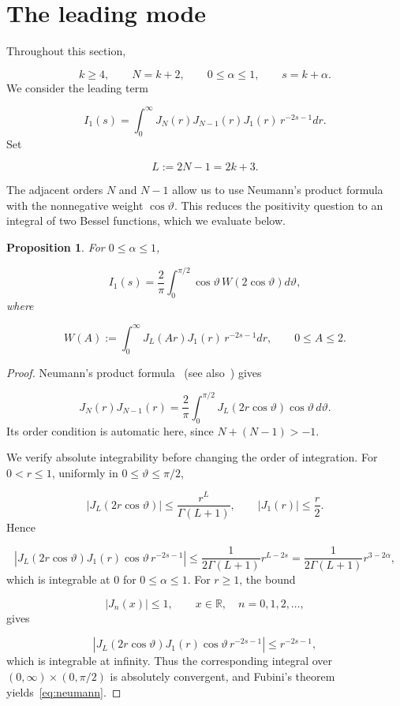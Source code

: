 \documentclass[11pt]{article}
\theoremstyle{plain}
\newtheorem{proposition}[theorem]{Proposition}
\theoremstyle{definition}
\theoremstyle{remark}
\begin{document}
\section{The leading mode}\label{sec:leading}

Throughout this section,

\[
  k \ge 4, \qquad  N = k+2, \qquad  0 \le \alpha \le 1, \qquad  s = k + \alpha .
\]
We consider the leading term

\[
  I_{1}(s) = \int_{0}^{\infty } J_N(r) J_{N-1}(r) J_{1}(r)\, r^{-2s-1} dr .
\]
Set

\[
  L := 2N - 1 = 2k+3 .
\]

The adjacent orders $N$ and $N-1$ allow us to use Neumann's product formula with the nonnegative weight $\cos \vartheta$. This reduces the positivity question to an integral of two Bessel functions, which we evaluate below.

\begin{proposition}\label{res:4.1}
For $0 \le \alpha \le 1$,

\begin{equation}\label{eq:neumann}
  I_{1}(s) = \frac{2}{\pi } \int_{0}^{\pi /2} \cos \vartheta \, W(2\cos \vartheta ) d\vartheta ,
\end{equation}
where

\[
  W(A) := \int_{0}^{\infty } J_L(Ar) J_{1}(r)\, r^{-2s-1} dr , \qquad  0 \le A \le 2 .
\]
\end{proposition}

\begin{proof}
Neumann's product formula~\cite[Eq.~10.9.26]{r1} (see also~\cite[Eq.~(5.43.1), p.~150]{r8}) gives

\[
  J_N(r) J_{N-1}(r) = \frac{2}{\pi } \int_{0}^{\pi /2} J_L(2r\cos \vartheta ) \cos \vartheta \, d\vartheta .
\]
Its order condition is automatic here, since $N + (N-1) > -1$.

We verify absolute integrability before changing the order of integration. For $0 < r \le 1$, uniformly in $0 \le \vartheta \le \pi /2$,

\[
  |J_L(2r\cos \vartheta )| \le \frac{r^{L}}{\Gamma (L+1)} , \qquad  |J_{1}(r)| \le \frac{r}{2} .
\]
Hence

\[
  \left| J_L(2r\cos \vartheta ) J_{1}(r) \cos \vartheta \, r^{-2s-1} \right| \le \frac{1}{2\Gamma (L+1)} r^{L-2s} = \frac{1}{2\Gamma (L+1)} r^{3-2\alpha } ,
\]
which is integrable at $0$ for $0 \le \alpha \le 1$. For $r \ge 1$, the bound~\cite[Eq.~10.14.1]{r1}

\[
  |J_n(x)| \le 1 , \qquad  x \in \mathbb{R}, \quad  n = 0,1,2,\dots ,
\]
gives

\[
  \left| J_L(2r\cos \vartheta ) J_{1}(r) \cos \vartheta \, r^{-2s-1} \right| \le r^{-2s-1} ,
\]
which is integrable at infinity. Thus the corresponding integral over $(0,\infty ) \times (0,\pi /2)$ is absolutely convergent, and Fubini's theorem yields~\eqref{eq:neumann}.
\end{proof}
\end{document}
